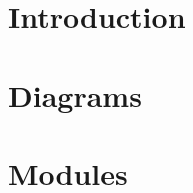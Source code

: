 \documentclass[11pt,a5paper,footinclude=true,headinclude=true]{report} %
\begin{document}

	\tableofcontents 
	
\part{Introduction}
  
\part{Diagrams}


\part{Modules}

\end{document}
